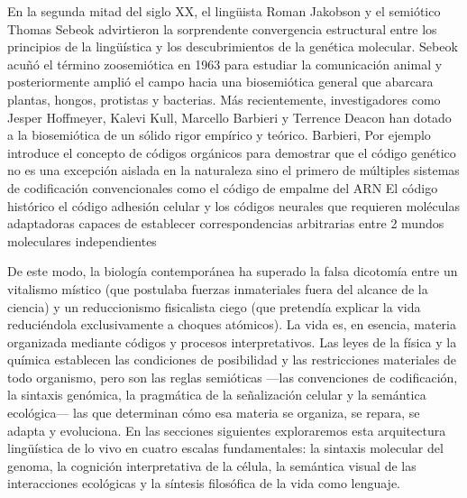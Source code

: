 En la segunda mitad del siglo XX, el lingüista Roman Jakobson y el semiótico Thomas Sebeok advirtieron la sorprendente convergencia estructural entre los principios de la lingüística y los descubrimientos de la genética molecular. 
Sebeok acuñó el término zoosemiótica en 1963 para estudiar la comunicación animal y posteriormente amplió el campo hacia una biosemiótica general que abarcara plantas, hongos, protistas y bacterias. Más recientemente, investigadores como Jesper Hoffmeyer, Kalevi Kull, Marcello Barbieri y Terrence Deacon han dotado a la biosemiótica de un sólido rigor empírico y teórico. 
Barbieri, Por ejemplo introduce el concepto de códigos orgánicos para demostrar que el código genético no es una excepción aislada en la naturaleza sino el primero de múltiples sistemas de codificación convencionales como el código de empalme del ARN El código histórico el código adhesión celular y los códigos neurales que requieren moléculas adaptadoras capaces de establecer correspondencias arbitrarias entre 2 mundos moleculares independientes

De este modo, la biología contemporánea ha superado la falsa dicotomía entre un vitalismo místico (que postulaba fuerzas inmateriales fuera del alcance de la ciencia) y un reduccionismo fisicalista ciego (que pretendía explicar la vida reduciéndola exclusivamente a choques atómicos). 
La vida es, en esencia, materia organizada mediante códigos y procesos interpretativos. Las leyes de la física y la química establecen las condiciones de posibilidad y las restricciones materiales de todo organismo, pero son las reglas semióticas —las convenciones de codificación, la sintaxis genómica, la pragmática de la señalización celular y la semántica ecológica— las que determinan cómo esa materia se organiza, se repara, se adapta y evoluciona. 
En las secciones siguientes exploraremos esta arquitectura lingüística de lo vivo en cuatro escalas fundamentales: la sintaxis molecular del genoma, la cognición interpretativa de la célula, la semántica visual de las interacciones ecológicas y la síntesis filosófica de la vida como lenguaje.



